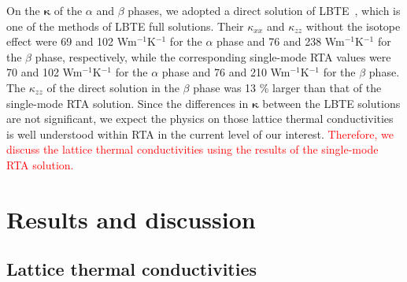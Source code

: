 \documentclass[twocolumn,amsmath,amssymb,a4paper,prb,superscriptaddress,floatfix]{revtex4-1}
\begin{document}
On the $\boldsymbol{\kappa}$ of the $\alpha$ and $\beta$ phases, we adopted a
direct solution of LBTE~\cite{chaput-direct}, which is one of the methods of
LBTE full solutions. Their $\kappa_{xx}$ and $\kappa_{zz}$ without the isotope
effect were 69 and 102 Wm$^{-1}$K$^{-1}$ for  the $\alpha$ phase and 76 and 238
Wm$^{-1}$K$^{-1}$ for the $\beta$ phase, respectively, while the corresponding
single-mode RTA values were 70 and 102 Wm$^{-1}$K$^{-1}$ for the $\alpha$ phase
and 76 and 210 Wm$^{-1}$K$^{-1}$ for the $\beta$ phase. The $\kappa_{zz}$ of
the direct solution in the $\beta$ phase was 13 \% larger than that of the
single-mode RTA solution. Since the differences in $\boldsymbol{\kappa}$
between the LBTE solutions are not significant, we expect the physics on those
lattice thermal conductivities is well understood within RTA in the current
level of our interest.  \textcolor {red} {Therefore, we discuss the lattice
thermal conductivities using  the results of the single-mode RTA solution.}

\section{Results and discussion}

\subsection{Lattice thermal conductivities}
\end{document}
